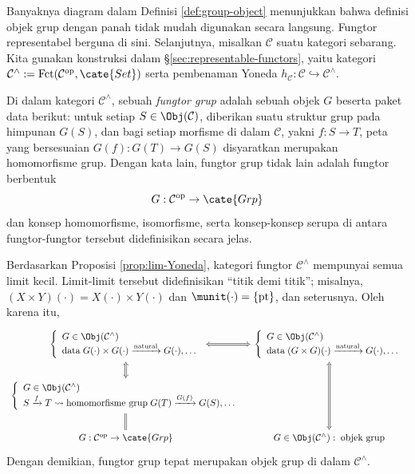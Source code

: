 Banyaknya diagram dalam Definisi \ref{def:group-object} menunjukkan bahwa definisi objek grup dengan panah tidak mudah digunakan secara langsung. Fungtor representabel berguna di sini. Selanjutnya, misalkan $\mathcal{C}$ suatu kategori sebarang. Kita gunakan konstruksi dalam \S\ref{sec:representable-functors}, yaitu kategori $\mathcal{C}^\wedge := \text{Fct}(\mathcal{C}^\text{op}, \cate{Set})$ serta pembenaman Yoneda $h_{\mathcal{C}}: \mathcal{C} \hookrightarrow \mathcal{C}^\wedge$.

\begin{definition}\label{def:group-functor}
	Di dalam kategori $\mathcal{C}^\wedge$, sebuah \emph{fungtor grup} adalah sebuah objek $G$ beserta paket data berikut: untuk setiap $S \in \Obj(\mathcal{C})$, diberikan suatu struktur grup pada himpunan $G(S)$, dan bagi setiap morfisme di dalam $\mathcal{C}$, yakni $f: S \to T$, peta yang bersesuaian $G(f): G(T) \to G(S)$ disyaratkan merupakan homomorfisme grup. Dengan kata lain, fungtor grup tidak lain adalah fungtor berbentuk
	\[ G: \mathcal{C}^\text{op} \to \cate{Grp} \]
	dan konsep homomorfisme, isomorfisme, serta konsep-konsep serupa di antara fungtor-fungtor tersebut didefinisikan secara jelas.
\end{definition}

Berdasarkan Proposisi \ref{prop:lim-Yoneda}, kategori fungtor $\mathcal{C}^\wedge$ mempunyai semua limit kecil. Limit-limit tersebut didefinisikan ``titik demi titik''; misalnya, $(X \times Y)(\cdot) = X(\cdot) \times Y(\cdot)$ dan $\munit(\cdot) = \{ \text{pt} \}$, dan seterusnya. Oleh karena itu,
\[\begin{tikzcd}[column sep=tiny]
	\left\{ \begin{array}{ll} G \in \Obj(\mathcal{C}^\wedge) \\ \text{data}\; G(\cdot) \times G(\cdot) \xrightarrow{\text{natural}} G(\cdot), \ldots \end{array}\right. \arrow[Leftrightarrow, r] &
	\left\{ \begin{array}{ll} G \in \Obj(\mathcal{C}^\wedge) \\ \text{data}\; (G \times G)(\cdot) \xrightarrow{\text{natural}} G(\cdot), \ldots \end{array}\right. \\
	\left\{ \begin{array}{ll} G \in \Obj(\mathcal{C}^\wedge) \\ S \xrightarrow{f} T \leadsto \text{homomorfisme grup}\; G(T) \xrightarrow{G(f)} G(S), \ldots \end{array}\right. \arrow[Leftrightarrow, u] & \\
	G: \mathcal{C}^{\text{op}} \to \cate{Grp} \arrow[equal, u] & G \in \Obj(\mathcal{C}^\wedge): \; \text{objek grup} \arrow[Leftrightarrow, uu]
\end{tikzcd}\]
Dengan demikian, fungtor grup tepat merupakan objek grup di dalam $\mathcal{C}^\wedge$.

